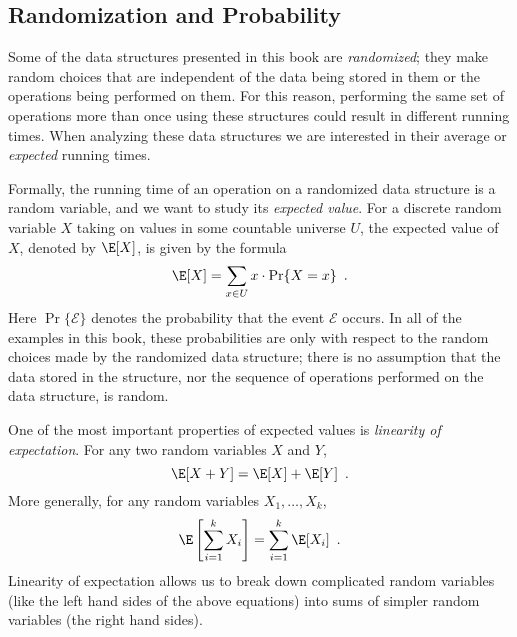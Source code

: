\subsection{Randomization and Probability}

Some of the data structures presented in this book are \emph{randomized}; they make random choices that are independent of the data being stored in them or the operations being performed on them.  For this reason, performing the same set of operations more than once using these structures could result in different running times.  When analyzing these data structures we are interested in their average or \emph{expected} running times.

Formally, the running time of an operation on a randomized data structure is a random variable, and we want to study its \emph{expected value}.   For a discrete random variable $X$ taking on values in some countable universe $U$, the expected value of $X$, denoted by $\E[X]$, is given by the formula
\[
    \E[X] = \sum_{x\in U} x\cdot\Pr\{X=x\} \enspace .
\]
Here $\Pr\{\mathcal{E}\}$ denotes the probability that the event $\mathcal{E}$ occurs.  In all of the examples in this book, these probabilities are only with respect to the random choices made by the randomized data structure;  there is no assumption that the data stored in the structure, nor the sequence of operations performed on the data structure, is random.

One of the most important properties of expected values is \emph{linearity of expectation}.   For any two random variables $X$ and $Y$,
\[
   \E[X+Y] = \E[X] + \E[Y] \enspace .
\]
More generally, for any random variables $X_1,\ldots,X_k$,
\[
   \E\left[\sum_{i=1}^k X_i\right] = \sum_{i=1}^k \E[X_i] \enspace .
\]
Linearity of expectation allows us to break down complicated random variables (like the left hand sides of the above equations) into sums of simpler random variables (the right hand sides).

